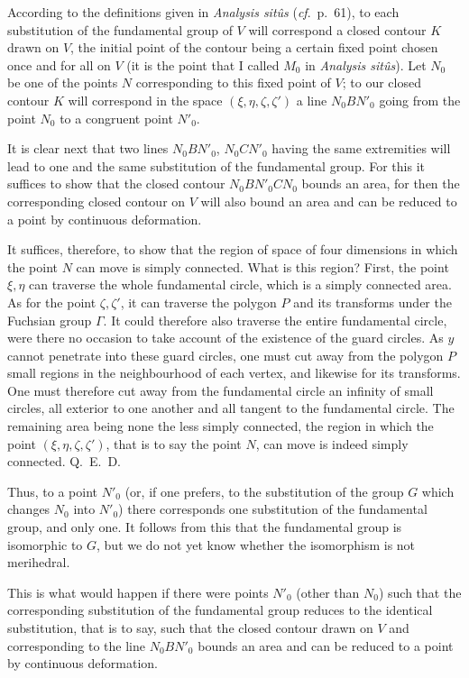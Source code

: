 \documentclass{article}
\begin{document}
According to the definitions given in \emph{Analysis sitûs} (\emph{cf}.\ p.\ 61), to each substitution of the fundamental group of $V$ will correspond a closed contour $K$ drawn on $V$, the initial point of the contour being a certain fixed point chosen once and for all on $V$ (it is the point that I called $M_{0}$ in \emph{Analysis sitûs}). Let $N_{0}$ be one of the points $N$ corresponding to this fixed point of $V$; to our closed contour $K$ will correspond in the space $(\xi, \eta, \zeta, \zeta')$ a line $N_{0}BN'_{0}$ going from the point $N_{0}$ to a congruent point $N'_{0}$.

It is clear next that two lines $N_{0}BN'_{0}$, $N_{0}CN'_{0}$ having the same extremities will lead to one and the same substitution of the fundamental group. For this it suffices to show that the closed contour $N_{0}BN'_{0}CN_{0}$ bounds an area, for then the corresponding closed contour on $V$ will also bound an area and can be reduced to a point by continuous deformation.

It suffices, therefore, to show that the region of space of four dimensions in which the point $N$ can move is simply connected. What is this region? First, the point $\xi, \eta$ can traverse the whole fundamental circle, which is a simply connected area. As for the point $\zeta, \zeta'$, it can traverse the polygon $P$ and its transforms under the Fuchsian group $\Gamma$. It could therefore also traverse the entire fundamental circle, were there no occasion to take
account of the existence of the guard circles. As $y$ cannot penetrate into these guard circles, one must cut away from the polygon $P$ small regions in the neighbourhood of each vertex, and likewise for its transforms. One must therefore cut away from the fundamental circle an infinity of small circles, all exterior to one another and all tangent to the fundamental circle. The remaining area being none the less simply connected, the region in which the point $(\xi, \eta, \zeta, \zeta')$, that is to say the point $N$, can move is indeed simply connected. Q.~E.~D.

Thus, to a point $N'_{0}$ (or, if one prefers, to the substitution of the group $G$ which changes $N_{0}$ into $N'_{0}$) there corresponds one substitution of the fundamental group, and only one. It follows from this that the fundamental group is isomorphic to $G$, but we do not yet know whether the isomorphism is not merihedral.

This is what would happen if there were points $N'_{0}$ (other than $N_{0}$) such that the corresponding substitution of the fundamental group reduces to the identical substitution, that is to say, such that the closed contour drawn on $V$ and corresponding to the line $N_{0}BN'_{0}$ bounds an area and can be reduced to a point by continuous deformation.
\end{document}
